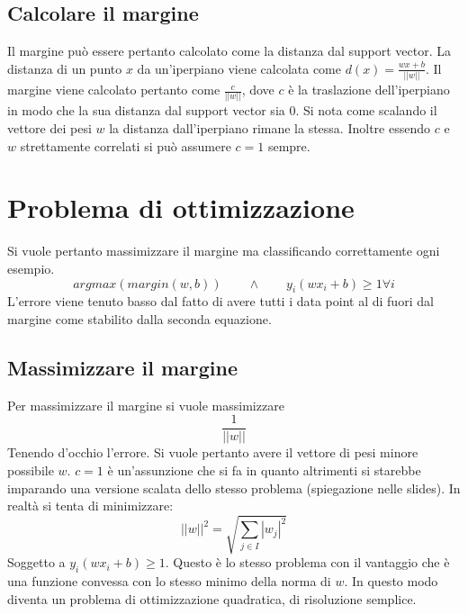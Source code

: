 	\subsection{Calcolare il margine}
	Il margine pu\`o essere pertanto calcolato come la distanza dal support vector.
	La distanza di un punto $x$ da un'iperpiano viene calcolata come $d(x) = \frac{wx+b}{||w||}$.
	Il margine viene calcolato pertanto come $\frac{c}{||w||}$, dove $c$ \`e la traslazione dell'iperpiano in modo che la sua distanza dal support vector sia $0$.
	Si nota come scalando il vettore dei pesi $w$ la distanza dall'iperpiano rimane la stessa.
	Inoltre essendo $c$ e $w$ strettamente correlati si pu\`o assumere $c=1$ sempre.

\section{Problema di ottimizzazione}
Si vuole pertanto massimizzare il margine ma classificando correttamente ogni esempio.
$$argmax(margin(w,b))\qquad\land\qquad y_i(wx_i + b) \ge 1 \forall i$$
L'errore viene tenuto basso dal fatto di avere tutti i data point al di fuori dal margine come stabilito dalla seconda equazione.

	\subsection{Massimizzare il margine}
	Per massimizzare il margine si vuole massimizzare
	$$\dfrac{1}{||w||}$$
	Tenendo d'occhio l'errore.
	Si vuole pertanto avere il vettore di pesi minore possibile $w$.
	$c=1$ \`e un'assunzione che si fa in quanto altrimenti si starebbe imparando una versione scalata dello stesso problema (spiegazione nelle slides).
	In realt\`a si tenta di minimizzare:
	$$||w||^2 = \sqrt{\sum\limits_{j\in I}|w_j|^2}$$
	Soggetto a $y_i(wx_i+b) \ge 1$.
	Questo \`e lo stesso problema con il vantaggio che \`e una funzione convessa con lo stesso minimo della norma di $w$.
	In questo modo diventa un problema di ottimizzazione quadratica, di risoluzione semplice.

